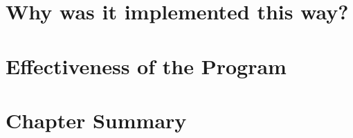 \section{Why was it implemented this way?}

        
\section{Effectiveness of the Program}


\section{Chapter Summary}

